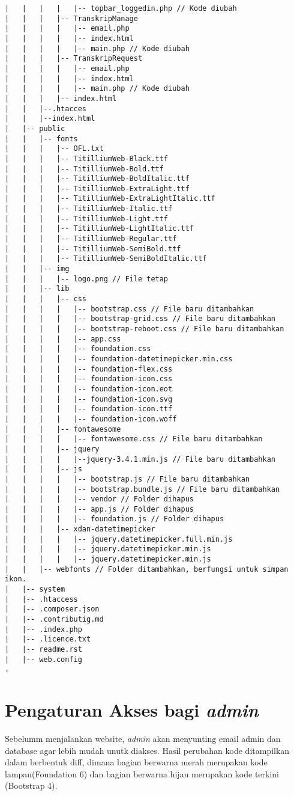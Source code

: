 \begin{lstlisting}[basicstyle=\ttfamily, frame=single, caption=Perubahan isi folder BlueTape,
columns=fullflexible, keepspaces=true, breaklines=true, label={lst:daftarfile}]
|   |   |   |   |-- topbar_loggedin.php // Kode diubah
|   |   |   |-- TranskripManage
|   |   |   |   |-- email.php
|   |   |   |   |-- index.html
|   |   |   |   |-- main.php // Kode diubah
|   |   |   |-- TranskripRequest
|   |   |   |   |-- email.php
|   |   |   |   |-- index.html
|   |   |   |   |-- main.php // Kode diubah
|   |   |   |-- index.html
|   |   |--.htacces
|   |   |--index.html
|   |-- public
|   |   |-- fonts
|   |   |   |-- OFL.txt
|   |   |   |-- TitilliumWeb-Black.ttf
|   |   |   |-- TitilliumWeb-Bold.ttf
|   |   |   |-- TitilliumWeb-BoldItalic.ttf
|   |   |   |-- TitilliumWeb-ExtraLight.ttf
|   |   |   |-- TitilliumWeb-ExtraLightItalic.ttf
|   |   |   |-- TitilliumWeb-Italic.ttf
|   |   |   |-- TitilliumWeb-Light.ttf
|   |   |   |-- TitilliumWeb-LightItalic.ttf
|   |   |   |-- TitilliumWeb-Regular.ttf
|   |   |   |-- TitilliumWeb-SemiBold.ttf
|   |   |   |-- TitilliumWeb-SemiBoldItalic.ttf
|   |   |-- img
|   |   |   |-- logo.png // File tetap
|   |   |-- lib 
|   |   |   |-- css
|   |   |   |   |-- bootstrap.css // File baru ditambahkan
|   |   |   |   |-- bootstrap-grid.css // File baru ditambahkan
|   |   |   |   |-- bootstrap-reboot.css // File baru ditambahkan
|   |   |   |   |-- app.css 
|   |   |   |   |-- foundation.css 
|   |   |   |   |-- foundation-datetimepicker.min.css 
|   |   |   |   |-- foundation-flex.css 
|   |   |   |   |-- foundation-icon.css 
|   |   |   |   |-- foundation-icon.eot 
|   |   |   |   |-- foundation-icon.svg 
|   |   |   |   |-- foundation-icon.ttf 
|   |   |   |   |-- foundation-icon.woff 
|   |   |   |-- fontawesome
|   |   |   |   |-- fontawesome.css // File baru ditambahkan
|   |   |   |-- jquery
|   |   |   |   |--jquery-3.4.1.min.js // File baru ditambahkan
|   |   |   |-- js
|   |   |   |   |-- bootstrap.js // File baru ditambahkan
|   |   |   |   |-- bootstrap.bundle.js // File baru ditambahkan
|   |   |   |   |-- vendor // Folder dihapus
|   |   |   |   |-- app.js // Folder dihapus
|   |   |   |   |-- foundation.js // Folder dihapus
|   |   |   |-- xdan-datetimepicker 
|   |   |   |   |-- jquery.datetimepicker.full.min.js
|   |   |   |   |-- jquery.datetimepicker.min.js
|   |   |   |   |-- jquery.datetimepicker.min.js
|   |   |-- webfonts // Folder ditambahkan, berfungsi untuk simpan ikon.
|   |-- system
|   |-- .htaccess
|   |-- .composer.json
|   |-- .contributig.md
|   |-- .index.php
|   |-- .licence.txt
|   |-- readme.rst
|   |-- web.config
.
\end{lstlisting}

\section{Pengaturan Akses bagi \textit{admin}}
Sebelumm menjalankan website, \textit{admin} akan menyunting email admin dan database agar lebih mudah unutk diakses. Hasil perubahan kode ditampilkan dalam berbentuk diff, dimana bagian berwarna merah merupakan kode lampau(Foundation 6) dan bagian berwarna hijau merupakan kode terkini  (Bootstrap 4).

